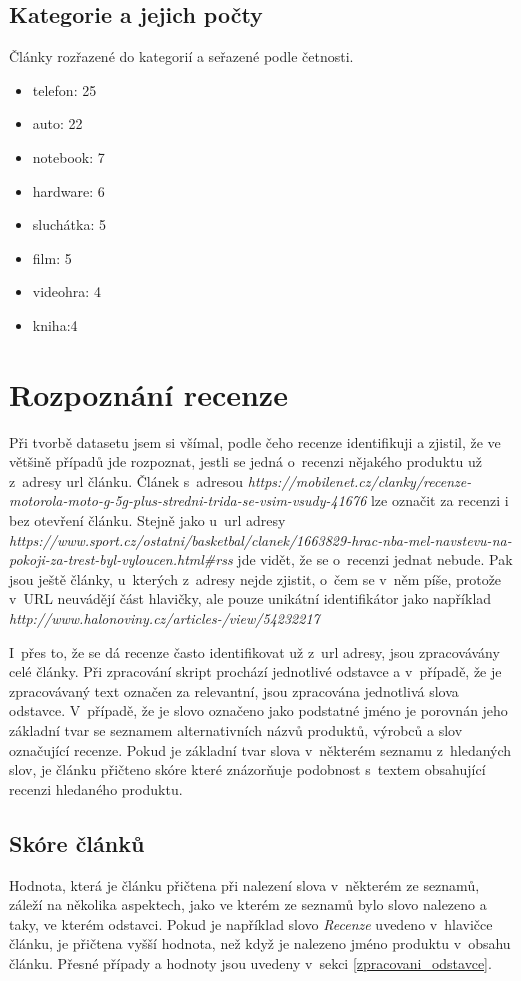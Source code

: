 \subsection*{Kategorie a jejich počty}
Články rozřazené do kategorií a seřazené podle četnosti.
\begin{itemize}
    \item telefon: 25
    \item auto: 22 
    \item notebook: 7
    \item hardware: 6
    \item sluchátka: 5
    \item film: 5
    \item videohra: 4
    \item kniha:4  
\end{itemize}


\section{Rozpoznání recenze}
Při tvorbě datasetu jsem si všímal, podle čeho recenze identifikuji a zjistil, že ve většině případů jde rozpoznat, jestli se jedná o~recenzi nějakého produktu už z~adresy url článku. Článek s~adresou \textit{https://mobilenet.cz/clanky/recenze-motorola-moto-g-5g-plus-stredni-trida\--\-s\-e\--\-v\-sim-vsudy-41676}
lze označit za recenzi i bez otevření článku. Stejně jako u~url adresy {\textit{https://www.sport.cz/ostatni/basketbal/clanek/1663829-hrac-nba-mel-navstevu-na-pokoji\--\-z\-a\--trest\-\--byl-vyloucen.html\#rss}} jde vidět, že se o~recenzi jednat nebude. Pak jsou ještě články, u~kterých z~adresy nejde zjistit, o~čem se v~něm píše, protože v~URL neuvádějí část hlavičky, ale pouze unikátní identifikátor jako například \textit{http://www.halonoviny.cz/articles-/view/54232217}

I~přes to, že se dá recenze často identifikovat už z~url adresy, jsou zpracovávány celé články. Při zpracování skript prochází jednotlivé odstavce a v~případě, že je zpracovávaný text označen za relevantní, jsou zpracována jednotlivá slova odstavce. V~případě, že je slovo označeno jako podstatné jméno je porovnán jeho základní tvar se seznamem alternativních názvů produktů, výrobců a slov označující recenze. Pokud je základní tvar slova v~některém seznamu z~hledaných slov, je článku přičteno skóre které znázorňuje podobnost s~textem obsahující recenzi hledaného produktu.

\subsection*{Skóre článků}
Hodnota, která je článku přičtena při nalezení slova v~některém ze seznamů, záleží na několika aspektech, jako ve kterém ze seznamů bylo slovo nalezeno a taky, ve kterém odstavci. Pokud je například slovo \textit{Recenze} uvedeno v~hlavičce článku, je přičtena vyšší hodnota, než když je nalezeno jméno produktu v~obsahu článku. Přesné případy a hodnoty jsou uvedeny v~sekci \ref{zpracovani_odstavce}.


